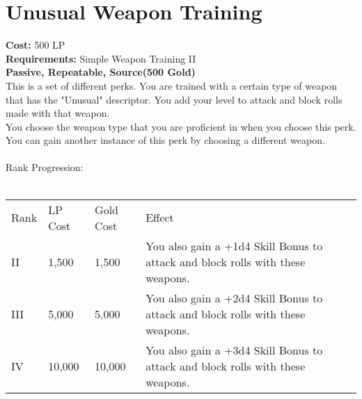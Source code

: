 \section{Unusual Weapon Training}\label{perk:unusualWeaponTraining}
\textbf{Cost:} 500 LP\\
\textbf{Requirements:} Simple Weapon Training II\\
\textbf{Passive, Repeatable, Source(500 Gold)}\\
This is a set of different perks.
You are trained with a certain type of weapon that has the "Unusual" descriptor.
You add your level to attack and block rolls made with that weapon.\\
You choose the weapon type that you are proficient in when you choose this perk.
You can gain another instance of this perk by choosing a different weapon.\\
\\
Rank Progression:\\
\\
\begin{longtable}{l | l | l | p{9cm}}
	Rank & LP Cost & Gold Cost & Effect\\
	II & 1,500 & 1,500 & You also gain a +1d4 Skill Bonus to attack and block rolls with these weapons.\\
	III & 5,000 & 5,000 & You also gain a +2d4 Skill Bonus to attack and block rolls with these weapons.\\
	IV & 10,000 & 10,000 & You also gain a +3d4 Skill Bonus to attack and block rolls with these weapons.\\
\end{longtable}